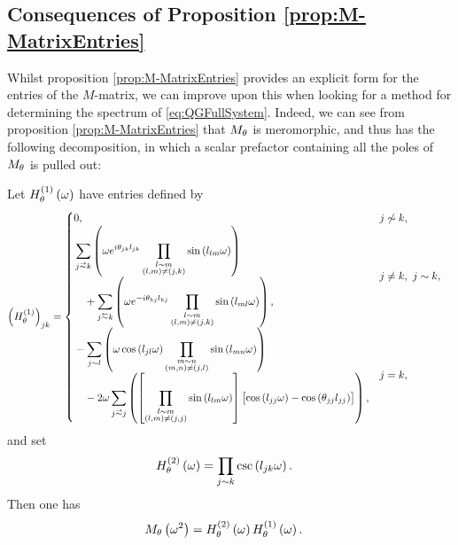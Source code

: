 \subsection{Consequences of Proposition \ref{prop:M-MatrixEntries}} \label{ssec:MMatrixConsequences}
Whilst proposition \ref{prop:M-MatrixEntries} provides an explicit form for the entries of the $M$-matrix, we can improve upon this when looking for a method for determining the spectrum of \eqref{eq:QGFullSystem}.
Indeed, we can see from proposition \ref{prop:M-MatrixEntries} that $M_\theta$ is meromorphic, and thus has the following decomposition, in which a scalar prefactor containing all the poles of $M_\theta$ is pulled out:
\begin{cory} \label{cory:M-MatrixEntriesNoPoles}
	Let $H^{(1)}_\theta\left( \omega \right)$ have entries defined by
	\begin{align*}
		\bracs{H^{(1)}_\qm}_{jk} &= 
		\begin{cases}
			\!\begin{aligned}
				&0,
			\end{aligned}			
			& j \not\con k, \\
			\!\begin{aligned}
				&\sum_{j\conLeft k} \bracs{ \omega e^{i\qm_{jk}l_{jk}} \prod_{\substack{ l\con m \\ \bracs{l,m} \neq \bracs{j,k} }}\sin\bracs{l_{lm}\omega} }
				\\ &\quad + \sum_{j\conRight k} \bracs{ \omega e^{-i\qm_{kj}l_{kj}} \prod_{\substack{l\con m \\ \bracs{l,m} \neq \bracs{j,k} }}\sin\bracs{l_{ml}\omega} },
			\end{aligned}
			& j\neq k, \ j\con k, \\
			\!\begin{aligned}
				&- \sum_{j\con l} \bracs{ \omega\cos\bracs{l_{jl}\omega}\prod_{\substack{ m\con n \\ \bracs{m,n}\neq\bracs{j,l} }}\sin\bracs{l_{mn}\omega} }
				\\ &\quad - 2\omega\sum_{j\conLeft j} \bracs{ \sqbracs{ \prod_{\substack{l\con m \\ \bracs{l,m}\neq\bracs{j,j} }}\sin\bracs{l_{lm}\omega} }\bigl[ \cos\bracs{l_{jj}\omega} - \cos\bracs{\qm_{jj}l_{jj}} \bigr] },
			\end{aligned}
			& j=k,
		\end{cases}
	\end{align*}
	and set
	\begin{align*}
		H^{(2)}_\theta\left( \omega \right) &= \prod_{j\sim k}\csc\left( l_{jk}\omega \right).
	\end{align*}
	Then one has
	\begin{align*}
		M_\theta\left( \omega^2 \right) &= H^{(2)}_\theta\left( \omega \right)H^{(1)}_\theta\left( \omega \right).
	\end{align*}
\end{cory}
